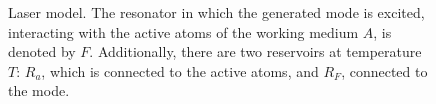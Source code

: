 \begin{figure}
\centering



\caption{Laser model. The resonator in which the generated mode is excited, interacting with the active atoms of the working medium $A$, is denoted by $F$. Additionally, there are two reservoirs at temperature $T$: $R_{a}$, which is connected to the active atoms, and $R_{F}$, connected to the mode.}
\label{figPart2Laser2_2}
\end{figure}